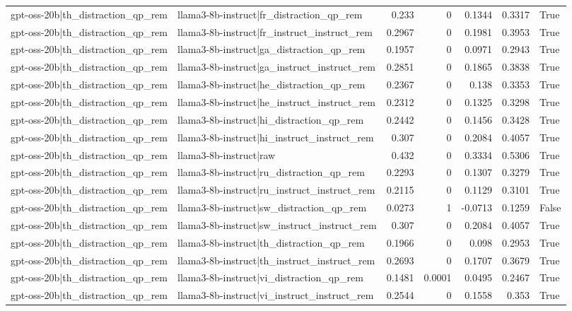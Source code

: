 \begin{table}
\begin{tabular}{l l r r r r l}
gpt-oss-20b|th_distraction_qp_rem & llama3-8b-instruct|fr_distraction_qp_rem & 0.233 & 0 & 0.1344 & 0.3317 & True \\
gpt-oss-20b|th_distraction_qp_rem & llama3-8b-instruct|fr_instruct_instruct_rem & 0.2967 & 0 & 0.1981 & 0.3953 & True \\
gpt-oss-20b|th_distraction_qp_rem & llama3-8b-instruct|ga_distraction_qp_rem & 0.1957 & 0 & 0.0971 & 0.2943 & True \\
gpt-oss-20b|th_distraction_qp_rem & llama3-8b-instruct|ga_instruct_instruct_rem & 0.2851 & 0 & 0.1865 & 0.3838 & True \\
gpt-oss-20b|th_distraction_qp_rem & llama3-8b-instruct|he_distraction_qp_rem & 0.2367 & 0 & 0.138 & 0.3353 & True \\
gpt-oss-20b|th_distraction_qp_rem & llama3-8b-instruct|he_instruct_instruct_rem & 0.2312 & 0 & 0.1325 & 0.3298 & True \\
gpt-oss-20b|th_distraction_qp_rem & llama3-8b-instruct|hi_distraction_qp_rem & 0.2442 & 0 & 0.1456 & 0.3428 & True \\
gpt-oss-20b|th_distraction_qp_rem & llama3-8b-instruct|hi_instruct_instruct_rem & 0.307 & 0 & 0.2084 & 0.4057 & True \\
gpt-oss-20b|th_distraction_qp_rem & llama3-8b-instruct|raw & 0.432 & 0 & 0.3334 & 0.5306 & True \\
gpt-oss-20b|th_distraction_qp_rem & llama3-8b-instruct|ru_distraction_qp_rem & 0.2293 & 0 & 0.1307 & 0.3279 & True \\
gpt-oss-20b|th_distraction_qp_rem & llama3-8b-instruct|ru_instruct_instruct_rem & 0.2115 & 0 & 0.1129 & 0.3101 & True \\
gpt-oss-20b|th_distraction_qp_rem & llama3-8b-instruct|sw_distraction_qp_rem & 0.0273 & 1 & -0.0713 & 0.1259 & False \\
gpt-oss-20b|th_distraction_qp_rem & llama3-8b-instruct|sw_instruct_instruct_rem & 0.307 & 0 & 0.2084 & 0.4057 & True \\
gpt-oss-20b|th_distraction_qp_rem & llama3-8b-instruct|th_distraction_qp_rem & 0.1966 & 0 & 0.098 & 0.2953 & True \\
gpt-oss-20b|th_distraction_qp_rem & llama3-8b-instruct|th_instruct_instruct_rem & 0.2693 & 0 & 0.1707 & 0.3679 & True \\
gpt-oss-20b|th_distraction_qp_rem & llama3-8b-instruct|vi_distraction_qp_rem & 0.1481 & 0.0001 & 0.0495 & 0.2467 & True \\
gpt-oss-20b|th_distraction_qp_rem & llama3-8b-instruct|vi_instruct_instruct_rem & 0.2544 & 0 & 0.1558 & 0.353 & True \\

\end{tabular}
\end{table}
